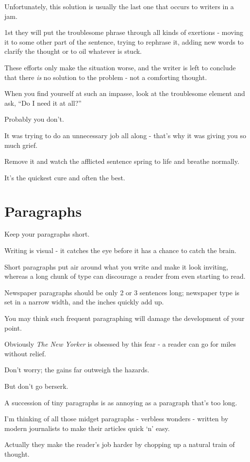 \documentclass{book}
\numberwithin{equation}{section}
\begin{document}
Unfortunately, this solution is usually the last one that occurs to writers in a jam.

1st they will put the troublesome phrase through all kinds of exertions - moving it to some other part of the sentence, trying to rephrase it, adding new words to clarify the thought or to oil whatever is stuck.

These efforts only make the situation worse, and the writer is left to conclude that there \textit{is} no solution to the problem - not a comforting thought.

When you find yourself at such an impasse, look at the troublesome element and ask, ``Do I need it at all?''

Probably you don't.

It was trying to do an unnecessary job all along - that's why it was giving you so much grief.

Remove it and watch the afflicted sentence spring to life and breathe normally.

It's the quickest cure and often the best.

\section{Paragraphs}
Keep your paragraphs short.

Writing is visual - it catches the eye before it has a chance to catch the brain.

Short paragraphs put air around what you write and make it look inviting, whereas a long chunk of type can discourage a reader from even starting to read.

%
Newspaper paragraphs should be only 2 or 3 sentences long; newspaper type is set in a narrow width, and the inches quickly add up.

You may think such frequent paragraphing will damage the development of your point.

Obviously \textit{The New Yorker} is obsessed by this fear - a reader can go for miles without relief.

Don't worry; the gains far outweigh the hazards.

%
But don't go berserk.

A succession of tiny paragraphs is as annoying as a paragraph that's too long.

I'm thinking of all those midget paragraphs - verbless wonders - written by modern journalists to make their articles quick `n' easy.

Actually they make the reader's job harder by chopping up a natural train of thought.
\end{document}
